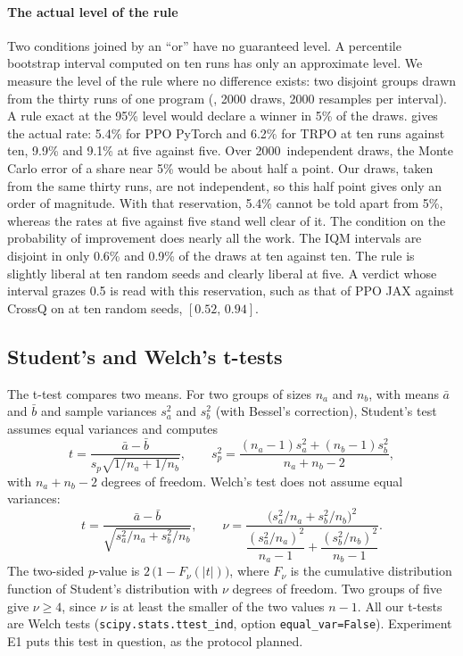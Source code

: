 \paragraph{The actual level of the rule}
Two conditions joined by an \enquote{or} have no guaranteed level. A percentile bootstrap interval computed on
ten runs has only an approximate level. We measure the level of the rule where no difference exists: two disjoint groups drawn from the thirty runs of one program
(, \num{2000} draws, \num{2000} resamples per interval). A rule exact
at the 95\% level would declare a winner in 5\% of the draws.  gives the actual rate:
5.4\% for PPO PyTorch and 6.2\% for TRPO at ten runs against ten, 9.9\% and 9.1\% at five against five. Over
\num{2000}~independent draws, the Monte Carlo error of a share near 5\% would be about half a point. Our draws,
taken from the same thirty runs, are not independent, so this half point gives only an order of magnitude. With
that reservation, 5.4\% cannot be told apart from 5\%, whereas the rates at five against five stand well clear
of it. The condition on the probability of improvement does nearly all the work.
The IQM intervals are disjoint in only 0.6\% and 0.9\% of the draws at ten against ten. The rule is
slightly liberal at ten random seeds and clearly liberal at five. A verdict whose interval grazes 0.5 is read
with this reservation, such as that of PPO JAX against CrossQ on  at ten random seeds,
$[0.52,\,0.94]$.


\subsection{Student's and Welch's t-tests}\label{sec:welch}
The t-test compares two means. For two groups of sizes $n_a$ and $n_b$, with means $\bar a$ and $\bar b$ and
sample variances $s_a^2$ and $s_b^2$ (with Bessel's correction), Student's test
\parencite{student1908probable} assumes equal variances and computes
\begin{equation}\label{eq:student}
  t = \frac{\bar a-\bar b}{s_p\sqrt{1/n_a+1/n_b}},\qquad
  s_p^2=\frac{(n_a-1)s_a^2+(n_b-1)s_b^2}{n_a+n_b-2},
\end{equation}
with $n_a+n_b-2$ degrees of freedom. Welch's test \parencite{welch1947generalization} does not assume equal
variances:
\begin{equation}\label{eq:welch}
  t = \frac{\bar a-\bar b}{\sqrt{s_a^2/n_a+s_b^2/n_b}},\qquad
  \nu = \frac{\bigl(s_a^2/n_a+s_b^2/n_b\bigr)^2}{\dfrac{(s_a^2/n_a)^2}{n_a-1}+\dfrac{(s_b^2/n_b)^2}{n_b-1}} .
\end{equation}
The two-sided $p$-value is $2\,\bigl(1-F_\nu(|t|)\bigr)$, where $F_\nu$ is the cumulative distribution function
of Student's distribution with $\nu$ degrees of freedom. Two groups of five give $\nu\ge 4$, since $\nu$ is at
least the smaller of the two values $n-1$. All our t-tests are Welch tests (\texttt{scipy.stats.ttest\_ind},
option \texttt{equal\_var=False}). Experiment E1 puts this test in question, as the protocol planned.

